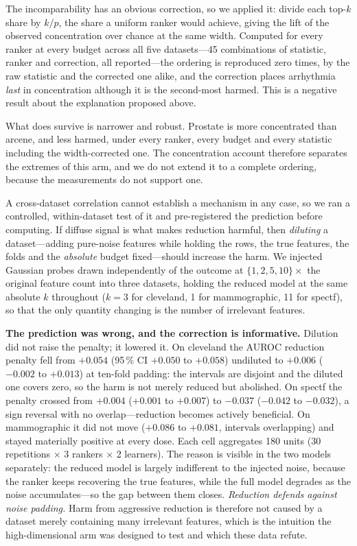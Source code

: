 \documentclass[fleqn,10pt]{wlscirep}
\newcommand{\result}[1]{#1}
\begin{document}
The incomparability has an obvious correction, so we applied it: divide each top-$k$ share by
$k/p$, the share a uniform ranker would achieve, giving the lift of the observed concentration over
chance at the same width. Computed for every ranker at every budget across all \result{five}
datasets---\result{45} combinations of statistic, ranker and correction, all reported---the ordering
is reproduced \result{zero} times, by the raw statistic and the corrected one alike, and the
correction places arrhythmia \emph{last} in concentration although it is the second-most harmed. This
is a negative result about the explanation proposed above.

What does survive is narrower and robust. Prostate is more concentrated than arcene, and less harmed,
under every ranker, every budget and every statistic including the width-corrected one. The
concentration account therefore separates the extremes of this arm, and we do not extend it to a
complete ordering, because the measurements do not support one.

A cross-dataset correlation cannot establish a mechanism in any case, so we ran a controlled,
within-dataset test of it and pre-registered the prediction before computing. If diffuse signal is what
makes reduction harmful, then \emph{diluting} a dataset---adding pure-noise features while holding the
rows, the true features, the folds and the \emph{absolute} budget fixed---should increase the harm. We
injected Gaussian probes drawn independently of the outcome at $\{1,2,5,10\}\times$ the original
feature count into three datasets, holding the reduced model at the same absolute $k$ throughout
($k=\result{3}$ for cleveland, \result{1} for mammographic, \result{11} for spectf), so that the only
quantity changing is the number of irrelevant features.

\textbf{The prediction was wrong, and the correction is informative.} Dilution did not raise the
penalty; it lowered it. On cleveland the AUROC reduction penalty fell from \result{$+0.054$}
(95\,\% CI \result{$+0.050$} to \result{$+0.058$}) undiluted to \result{$+0.006$}
(\result{$-0.002$} to \result{$+0.013$}) at ten-fold padding: the intervals are disjoint and the
diluted one covers zero, so the harm is not merely reduced but abolished. On spectf the penalty
crossed from \result{$+0.004$} (\result{$+0.001$} to \result{$+0.007$}) to \result{$-0.037$}
(\result{$-0.042$} to \result{$-0.032$}), a sign reversal with no overlap---reduction becomes
actively beneficial. On mammographic it did not move (\result{$+0.086$} to \result{$+0.081$},
intervals overlapping) and stayed materially positive at every dose. Each cell aggregates
\result{180} units (\result{30} repetitions $\times$ \result{3} rankers $\times$ \result{2}
learners). The reason is visible in the two models separately: the
reduced model is largely indifferent to the injected noise, because the ranker keeps recovering the
true features, while the full model degrades as the noise accumulates---so the gap between them closes.
\emph{Reduction defends against noise padding.} Harm from aggressive reduction is therefore not caused
by a dataset merely containing many irrelevant features, which is the intuition the high-dimensional
arm was designed to test and which these data refute.
\end{document}
